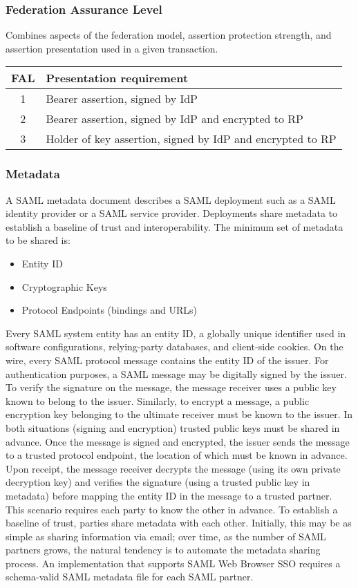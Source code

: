 \documentclass[a4paper, 10pt, titlepage]{article}
\begin{document}
\subsubsection*{Federation Assurance Level}
Combines aspects of the federation model, assertion protection strength, and assertion presentation used in a given transaction.
\begin{center}
\begin{tabular}{|c|l|} \hline
FAL & Presentation requirement \\ \hline
1 & Bearer assertion, signed by IdP \\
2 & Bearer assertion, signed by IdP and encrypted to RP\\
3 & Holder of key assertion, signed by IdP and encrypted to RP\\ \hline
\end{tabular}
\end{center}
\newpage
\subsubsection*{Metadata}
A SAML metadata document describes a SAML deployment such as a SAML identity provider or a SAML service provider. Deployments share metadata to establish a baseline of trust and interoperability. The minimum set of metadata to be shared is:
\begin{itemize}
\item Entity ID
\item Cryptographic Keys
\item Protocol Endpoints (bindings and URLs)
\end{itemize}
Every SAML system entity has an entity ID, a globally unique identifier used in software configurations, relying-party databases, and client-side cookies. On the wire, every SAML protocol message contains the entity ID of the issuer.
For authentication purposes, a SAML message may be digitally signed by the issuer. To verify the signature on the message, the message receiver uses a public key known to belong to the issuer. Similarly, to encrypt a message, a public encryption key belonging to the ultimate receiver must be known to the issuer. In both situations (signing and encryption) trusted public keys must be shared in advance. Once the message is signed and encrypted, the issuer sends the message to a trusted protocol endpoint, the location of which must be known in advance. Upon receipt, the message receiver decrypts the message (using its own private decryption key) and verifies the signature (using a trusted public key in metadata) before mapping the entity ID in the message to a trusted partner. This scenario requires each party to know the other in advance. To establish a baseline of trust, parties share metadata with each other. Initially, this may be as simple as sharing information via email; over time, as the number of SAML partners grows, the natural tendency is to automate the metadata sharing process. An implementation that supports SAML Web Browser SSO requires a schema-valid SAML metadata file for each SAML partner.
\end{document}
